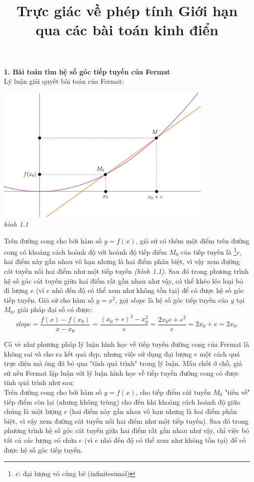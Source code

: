 \documentclass[a4paper,12pt]{article}
\title{\vspace{-8ex} \bfseries Trực giác về phép tính Giới hạn qua các bài toán kinh điển}
\date{\vspace{-8ex}}
\begin{document}
\maketitle
\textbf{1. Bài toán tìm hệ số góc tiếp tuyến của Fermat}\\

Lý luận giải quyết bài toán của Fermat:

\begin{center}
	\includegraphics[width=0.8\textwidth]{fermat}\\
	\textit{hình 1.1}
\end{center}

Trên đường cong cho bởi hàm số $y=f(x)$, giả sử có thêm một điểm trên đường cong có khoảng cách hoành độ với hoành độ tiếp điểm $M_0$ của tiếp tuyến là \footnote{$e$: đại lượng vô cùng bé (infinitesimal)}$e$, hai điểm này gần nhau vô hạn nhưng là hai điểm phân biệt, vì vậy xem đường cát tuyến nối hai điểm như một tiếp tuyến \textit{(hình 1.1)}. Sau đó trong phương trình hệ số góc cát tuyến giữa hai điểm rất gần nhau như vậy, có thể khéo léo loại bỏ đi lượng $e$ (vì $e$ nhỏ đến độ có thể xem như không tồn tại) để có được hệ số góc tiếp tuyến. Giả sử cho hàm số $y=x^2$, gọi $slope$ là hệ số góc tiếp tuyến của $y$ tại $M_0$, giải pháp đại số có được:\\
$$ slope=\frac{f(x)-f(x_0)}{x-x_0} = \frac{(x_0+e)^2-x_0^2}{e}=\frac{2x_0e+e^2}{e}=2x_0+e=2x_0.$$

Có vẻ như phương pháp lý luận hình học về tiếp tuyến đường cong của Fermat là không sai và cho ra kết quả đẹp, nhưng việc sử dụng đại lượng $e$ một cách quá trực diện mà ông đã bỏ qua "tính quá trình" trong lý luận. Mấu chốt ở chỗ, giả sử nếu Fermat lập luận với lý luận hình học về tiếp tuyến đường cong có được tính quá trình như sau:\\

Trên đường cong cho bởi hàm số $y=f(x)$, cho tiếp điểm cát tuyến $M_0$ "tiến về" tiếp điểm còn lại (nhưng không trùng) cho đến khi khoảng cách hoành độ giữa chúng là một lượng $e$ (hai điểm này gần nhau vô hạn nhưng là hai điểm phân biệt, vì vậy xem đường cát tuyến nối hai điểm như một tiếp tuyến). Sau đó trong phương trình hệ số góc cát tuyến giữa hai điểm rất gần nhau như vậy, chỉ việc bỏ tất cả các lượng có chứa $e$ (vì $e$ nhỏ đến độ có thể xem như không tồn tại) để có được hệ số góc tiếp tuyến.\\
\end{document}
